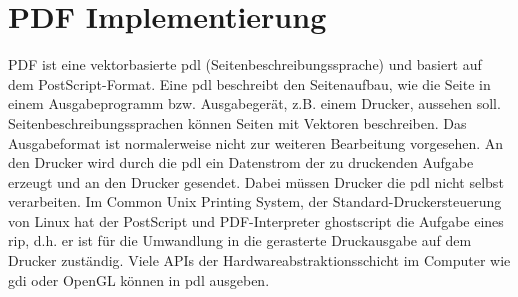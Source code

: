 \section{PDF Implementierung}
PDF ist eine vektorbasierte \acrfull{pdl} (Seitenbeschreibungssprache) und basiert auf dem PostScript-Format. Eine \acrshort{pdl} beschreibt den Seitenaufbau, wie die Seite in einem Ausgabeprogramm bzw. Ausgabegerät, z.B. einem Drucker, aussehen soll.  Seitenbeschreibungssprachen können Seiten mit Vektoren beschreiben. Das Ausgabeformat ist normalerweise nicht zur weiteren Bearbeitung vorgesehen. An den Drucker wird durch die \ac{pdl} ein Datenstrom der zu druckenden Aufgabe erzeugt und an den Drucker gesendet. Dabei müssen Drucker die \acrshort{pdl} nicht selbst verarbeiten. Im Common Unix Printing System, der Standard-Druckersteuerung von Linux hat der PostScript und PDF-Interpreter ghostscript die Aufgabe eines \ac{rip}, d.h. er ist für die Umwandlung in die gerasterte Druckausgabe auf dem Drucker zuständig. Viele APIs der Hardwareabstraktionsschicht im Computer wie \acrfull{gdi} oder OpenGL können in \acrshort{pdl} ausgeben.
